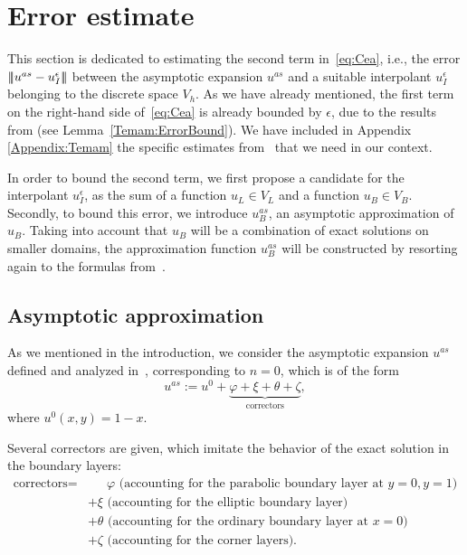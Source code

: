 \documentclass{article}
\newcommand{\vvvert}{\ensuremath|\!|\!|\xspace}
\newcommand{\ueps}{u^\epsilon}
\newcommand{\uas}{u^{as}}
\begin{document}
\section{Error estimate}\label{Sec:ErrorEstimate}

This section is dedicated to estimating the second term in~\eqref{eq:Cea}, i.e., the error $\vvvert  \uas - \ueps_I\vvvert $ between the asymptotic expansion $\uas$ and a suitable interpolant $\ueps_I$ belonging to the discrete space $V_h$.
As we have already mentioned,
the first term on the right-hand side of~\eqref{eq:Cea} is already bounded by $\epsilon$, due to the results from \cite{GieEtAl:13} (see Lemma~\ref{Temam:ErrorBound}). We have included in Appendix \ref{Appendix:Temam} the specific estimates from~\cite{GieEtAl:13} that we need in our context.

In order to bound the second term, we first propose a candidate for the interpolant $\ueps_I$, as the sum of a function $u_L \in V_L$ and a function $u_B \in V_B$.
Secondly, to bound this error, we
introduce $u_B^{as}$, an asymptotic approximation of $u_B$. 
Taking into account that $u_B$ will be a combination of exact solutions on smaller domains, 
the approximation function $u_B^{as}$ will be constructed by resorting again to the formulas from~\cite{GieEtAl:13}.

 

\subsection{Asymptotic approximation}

As we mentioned in the introduction, we consider the asymptotic expansion $\uas$ defined and analyzed in~\cite{GieEtAl:13}, corresponding to $n=0$, which is of the form
\begin{equation*}
\uas := u^0 + \underbrace{\varphi+\xi+\theta+\zeta}_\text{correctors},
\end{equation*}
where $u^0(x,y) = 1-x$.

Several correctors are given, which imitate the behavior of the exact solution in the boundary layers:
$$
\begin{aligned}
\text{correctors} = {}&\phantom{+}\; \varphi \text{ (accounting for the parabolic boundary layer at } y=0, y=1) \\
  &+ \xi \text{ (accounting for the elliptic boundary layer)} \\
   &+ \theta \text{ (accounting for the ordinary boundary layer at } x=0) \\
 &+ \zeta \text{ (accounting for the corner layers)}
 .
\end{aligned}
$$
\end{document}
